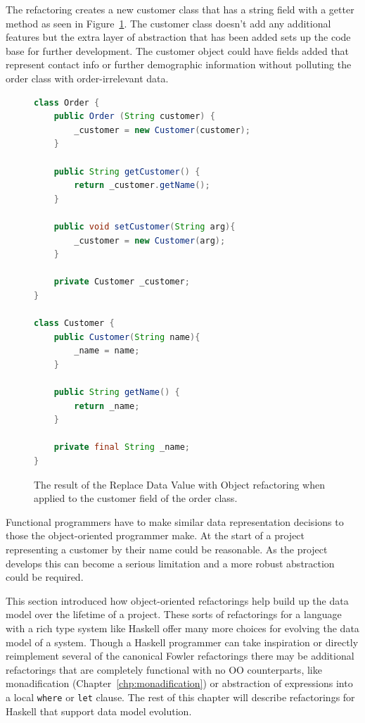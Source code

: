 The refactoring creates a new customer class that has a string field with a getter method as seen in Figure~\ref{custCls}. The customer class doesn't add any additional features but the extra layer of abstraction that has been added sets up the code base for further development. The customer object could have fields added that represent contact info or further demographic information without polluting the order class with order-irrelevant data.

\begin{figure}[t]
\begin{lstlisting}[language = java,tabsize=4]
class Order {
	public Order (String customer) {
		_customer = new Customer(customer);	
	}
	
	public String getCustomer() {
		return _customer.getName();
	}
	
	public void setCustomer(String arg){
		_customer = new Customer(arg);	
	}
	
	private Customer _customer;
}

class Customer {
	public Customer(String name){
		_name = name;
	}
	
	public String getName() {
		return _name;
	}
	
	private final String _name;
}
\end{lstlisting}
\caption{The result of the Replace Data Value with Object refactoring when applied to the customer field of the order class.}
\label{custCls}
\end{figure}

Functional programmers have to make similar data representation decisions to those the object-oriented programmer make. At the start of a project representing a customer by their name could be reasonable. As the project develops this can become a serious limitation and a more robust abstraction could be required. 

This section introduced how object-oriented refactorings help build up the data model over the lifetime of a project. These sorts of refactorings for a language with a rich type system like Haskell offer many more choices for evolving the data model of a system. Though a Haskell programmer can take inspiration or directly reimplement several of the canonical Fowler refactorings there may be additional refactorings that are completely functional with no OO counterparts, like monadification (Chapter~\ref{chp:monadification}) or abstraction of expressions into a local \texttt{where} or \texttt{let} clause. The rest of this chapter will describe refactorings for Haskell that support data model evolution.  

